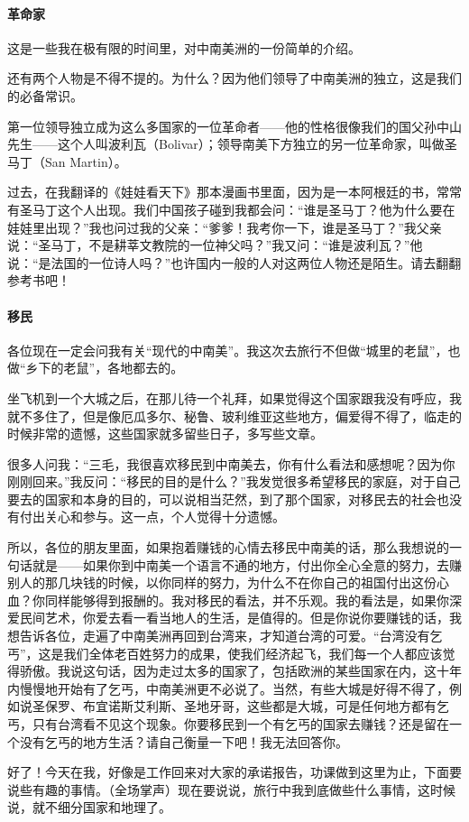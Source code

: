 \paragraph*{革命家}
\par 这是一些我在极有限的时间里，对中南美洲的一份简单的介绍。
\par 还有两个人物是不得不提的。为什么？因为他们领导了中南美洲的独立，这是我们的必备常识。
\par 第一位领导独立成为这么多国家的一位革命者——他的性格很像我们的国父孙中山先生——这个人叫波利瓦（Bolivar）；领导南美下方独立的另一位革命家，叫做圣马丁（San Martin）。
\par 过去，在我翻译的《娃娃看天下》那本漫画书里面，因为是一本阿根廷的书，常常有圣马丁这个人出现。我们中国孩子碰到我都会问：“谁是圣马丁？他为什么要在娃娃里出现？”我也问过我的父亲：“爹爹！我考你一下，谁是圣马丁？”我父亲说：“圣马丁，不是耕莘文教院的一位神父吗？”我又问：“谁是波利瓦？”他说：“是法国的一位诗人吗？”也许国内一般的人对这两位人物还是陌生。请去翻翻参考书吧！
\paragraph*{移民}
\par 各位现在一定会问我有关“现代的中南美”。我这次去旅行不但做“城里的老鼠”，也做“乡下的老鼠”，各地都去的。
\par 坐飞机到一个大城之后，在那儿待一个礼拜，如果觉得这个国家跟我没有呼应，我就不多住了，但是像厄瓜多尔、秘鲁、玻利维亚这些地方，偏爱得不得了，临走的时候非常的遗憾，这些国家就多留些日子，多写些文章。
\par 很多人问我：“三毛，我很喜欢移民到中南美去，你有什么看法和感想呢？因为你刚刚回来。”我反问：“移民的目的是什么？”我发觉很多希望移民的家庭，对于自己要去的国家和本身的目的，可以说相当茫然，到了那个国家，对移民去的社会也没有付出关心和参与。这一点，个人觉得十分遗憾。
\par 所以，各位的朋友里面，如果抱着赚钱的心情去移民中南美的话，那么我想说的一句话就是——如果你到中南美一个语言不通的地方，付出你全心全意的努力，去赚别人的那几块钱的时候，以你同样的努力，为什么不在你自己的祖国付出这份心血？你同样能够得到报酬的。我对移民的看法，并不乐观。我的看法是，如果你深爱民间艺术，你爱去看一看当地人的生活，是值得的。但是你说你要赚钱的话，我想告诉各位，走遍了中南美洲再回到台湾来，才知道台湾的可爱。“台湾没有乞丐”，这是我们全体老百姓努力的成果，使我们经济起飞，我们每一个人都应该觉得骄傲。我说这句话，因为走过太多的国家了，包括欧洲的某些国家在内，这十年内慢慢地开始有了乞丐，中南美洲更不必说了。当然，有些大城是好得不得了，例如说圣保罗、布宜诺斯艾利斯、圣地牙哥，这些都是大城，可是任何地方都有乞丐，只有台湾看不见这个现象。你要移民到一个有乞丐的国家去赚钱？还是留在一个没有乞丐的地方生活？请自己衡量一下吧！我无法回答你。
\par 好了！今天在我，好像是工作回来对大家的承诺报告，功课做到这里为止，下面要说些有趣的事情。（全场掌声）现在要说说，旅行中我到底做些什么事情，这时候说，就不细分国家和地理了。
